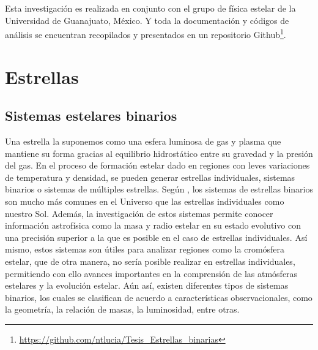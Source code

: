 \documentclass[12pt,oneside,openany,letter]{book}
\begin{document}
Esta investigación es realizada en conjunto con el grupo de física estelar de la Universidad de Guanajuato, México. Y toda la documentación y códigos de análisis se encuentran recopilados y presentados en un repositorio Github\footnote{\url{https://github.com/ntlucia/Tesis_Estrellas_binarias}}.

\chapter{Estrellas}\label{cap:estrellas}

\section{Sistemas estelares binarios}

Una estrella la suponemos como una esfera luminosa de gas y plasma que mantiene su forma gracias al equilibrio hidrostático entre su gravedad y la presión del gas. En el proceso de formación estelar dado en regiones con leves variaciones de temperatura y densidad, se pueden generar estrellas individuales, sistemas binarios o sistemas de múltiples estrellas. Según \citep{fisher2005local}, los sistemas de estrellas binarios son mucho más comunes en el Universo que las estrellas individuales como nuestro Sol. Además, la investigación de estos sistemas permite conocer información astrofísica como la masa y radio estelar en su estado evolutivo con una precisión superior a la que es posible en el caso de estrellas individuales. Así mismo, estos sistemas son útiles para analizar regiones como la cromósfera estelar, que de otra manera, no sería posible realizar en estrellas individuales, permitiendo con ello avances importantes en la comprensión de las atmósferas estelares y la evolución estelar. Aún así, existen diferentes tipos de sistemas binarios, los cuales se clasifican de acuerdo a características observacionales, como la geometría, la relación de masas, la luminosidad, entre otras.
\end{document}
